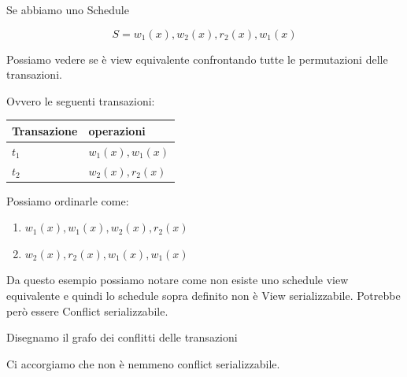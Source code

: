 \begin{exmp}
    Se abbiamo uno Schedule

    \[S = w_1(x), w_2(x), r_2(x), w_1(x)\]

    Possiamo vedere se è view equivalente confrontando tutte le permutazioni delle transazioni.

    Ovvero le seguenti transazioni:

    \begin{center}
        \begin{tabularx}{10cm}{|p{25mm}|X|}
            \hline
            \rowcolor{gray!30}
            \textbf{Transazione} & \textbf{operazioni}\\
            \hline
            $t_1$& $w_1(x), w_1(x)$\\
            $t_2$& $w_2(x), r_2(x)$\\
            \hline
        \end{tabularx}
    \end{center}

    Possiamo ordinarle come:

    \begin{enumerate}
        \item $w_1(x), w_1(x), w_2(x), r_2(x)$
        \item $w_2(x), r_2(x), w_1(x), w_1(x)$
    \end{enumerate}

    Da questo esempio possiamo notare come non esiste uno schedule view equivalente e quindi lo schedule sopra definito non è View serializzabile. Potrebbe però essere Conflict serializzabile.

    Disegnamo il grafo dei conflitti delle transazioni
    \begin{center}
    \end{center}

    Ci accorgiamo che non è nemmeno conflict serializzabile.
\end{exmp}

